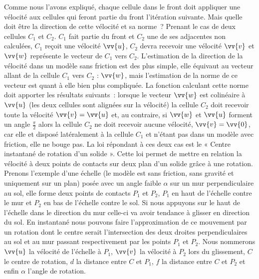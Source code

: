 \documentclass[a4paper,11pt]{article}
\begin{document}
Comme nous l'avons expliqué, chaque cellule dans le front doit appliquer une vélocité aux cellules qui feront partie du front l'itération suivante.
Mais quelle doit être la direction de cette vélocité et sa norme~?
Prenant le cas de deux cellules $C_1$ et $C_2$.
$C_1$ fait partie du front et $C_2$ une de ses adjacentes non calculées, $C_1$ reçoit une vélocité $\vv{u}$, $C_2$ devra recevoir une vélocité $\vv{v}$ et $\vv{w}$ représente le vecteur de $C_1$ vers $C_2$.
L'estimation de la direction de la vélocité dans un modèle sans friction est des plus simple, elle équivaut au vecteur allant de la cellule $C_1$ vers $C_2$ : $\vv{w}$, mais l'estimation de la norme de ce vecteur est quant à elle bien plus compliquée.
La fonction calculant cette norme doit apporter les résultats suivants~:
lorsque le vecteur $\vv{w}$ est colinéaire à $\vv{u}$ (les deux cellules sont alignées sur la vélocité) la cellule $C_2$ doit recevoir toute la vélocité $\vv{v} = \vv{u}$ et, au contraire, si $\vv{w}$ et $\vv{u}$ forment un angle $\frac{\pi}{2}$ alors la cellule $C_2$ ne doit recevoir aucune vélocité, $\vv{v} = \vv{0}$, car elle et disposé latéralement à la cellule $C_1$ et n'étant pas dans un modèle avec friction, elle ne bouge pas.
La loi répondant à ces deux cas est le « Centre instantané de rotation d'un solide ».
Cette loi permet de mettre en relation la vélocité à deux points de contacts sur deux plan d'un solide grâce à une rotation.
Prenons l'exemple d'une échelle (le modèle est sans friction, sans gravité et uniquement sur un plan) posée avec un angle faible $\alpha$ sur un mur perpendiculaire au sol, elle forme deux points de contacts $P_1$ et $P_2$, $P_1$ en haut de l'échelle contre le mur et $P_2$ en bas de l'échelle contre le sol.
Si nous appuyons sur le haut de l'échelle dans le direction du mur celle-ci va avoir tendance à glisser en direction du sol.
En instantané nous pouvons faire l'approximation de ce mouvement par un rotation dont le centre serait l'intersection des deux droites perpendiculaires au sol et au mur passant respectivement par les points $P_1$ et $P_2$.
Nous nommerons $\vv{u}$ la vélocité de l'échelle à $P_1$, $\vv{v}$ la vélocité à $P_2$ lors du glissement, $C$ le centre de rotation, $d$ la distance entre $C$ et $P_1$, $f$ la distance entre $C$ et $P_2$ et enfin $\alpha$ l'angle de rotation.
\end{document}

